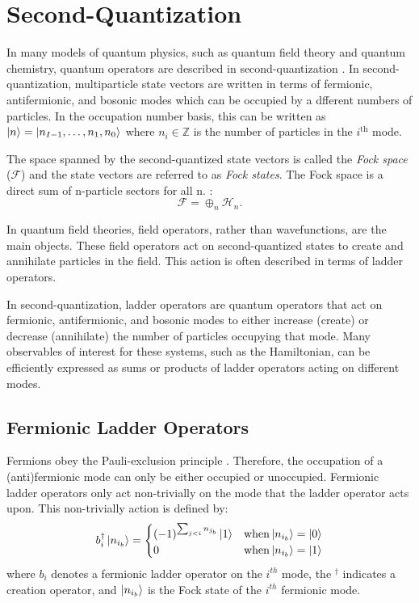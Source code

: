 \section{Second-Quantization}
\label{sec:theory}

In many models of quantum physics, such as quantum field theory and quantum chemistry, quantum operators are described in second-quantization \cite{Sakurai_Napolitano_2020}.
In second-quantization, multiparticle state vectors are written in terms of fermionic, antifermionic, and bosonic modes which can be occupied by a dfferent numbers of particles.
In the occupation number basis, this can be written as $\ket{n} = \ket{n_{I-1}, \dots, n_1, n_0}$ where $n_i \in \mathbb{Z}$ is the number of particles in the $i^\text{th}$ mode.

The space spanned by the second-quantized state vectors is called the \textit{Fock space} ($\mathcal{F}$) and the state vectors are referred to as \textit{Fock states}.
The Fock space is a direct sum of n-particle sectors for all n. \cite{Schwartz_2013}:
\begin{equation}
    \mathcal{F} = \oplus_n \mathcal{H}_n.
\end{equation}

In quantum field theories, field operators, rather than wavefunctions, are the main objects.
These field operators act on second-quantized states to create and annihilate particles in the field.
This action is often described in terms of ladder operators.

In second-quantization, ladder operators are quantum operators that act on fermionic, antifermionic, and bosonic modes to either increase (create) or decrease (annihilate) the number of particles occupying that mode.
Many observables of interest for these systems, such as the Hamiltonian, can be efficiently expressed as sums or products of ladder operators acting on different modes.

\subsection{Fermionic Ladder Operators}
\label{subsec:fermionic-operators}

Fermions obey the Pauli-exclusion principle \cite{pauli1925zusammenhang}.
Therefore, the occupation of a (anti)fermionic mode can only be either occupied or unoccupied.
Fermionic ladder operators only act non-trivially on the mode that the ladder operator acts upon.
This non-trivially action is defined by:
\begin{equation}
    \label{eq:fermionic-creation}
    b_i^\dagger \ket{n_{i_b}} = 
    \begin{cases} 
        (-1)^{\sum_{j < i} n_{j_b}} \ket{1}  & {\rm when} \ket{n_{i_b}} = \ket{0} \\
        0 & {\rm when} \ket{n_{i_b}} = \ket{1}
    \end{cases}
\end{equation}
where $b_i$ denotes a fermionic ladder operator on the $i^{th}$ mode, the $^\dagger$ indicates a creation operator, and $\ket{n_{i_b}}$ is the Fock state of the $i^{th}$ fermionic mode.

